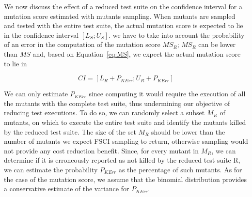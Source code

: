 We now discuss the effect of a reduced test suite on the confidence interval for a mutation score estimated with mutants sampling. When mutants are sampled and tested with the entire test suite, the actual mutation score is expected to lie in the confidence interval $[\mathit{L}_{S};\mathit{U}_{S}]$.
we have to take into account the probability of an error in the computation of the mutation score $\mathit{MS}_R$;  $\mathit{MS}_R$ can be lower than $\mathit{MS}$ and, based on Equation~\ref{eq:MS}, we expect the actual mutation score to lie in

\begin{equation}
\label{eq:CI_2}
\mathit{CI}=[\mathit{L}_{R}+P_\mathit{KErr};\mathit{U}_{R}+P_{\mathit{KErr}}]
\end{equation}

We can only estimate  $P_{\mathit{KErr}}$ since computing it would require the execution of all the mutants with the complete test suite, thus undermining our objective of reducing test executions.
To do so, we can randomly select a subset $M_R$ of mutants, on which to execute the entire test suite and identify the mutants killed by the reduced test suite. %
The size of the set $M_R$ should be lower than the number of mutants we expect FSCI sampling to return,
otherwise sampling would not provide any cost reduction benefit.
Since, for every mutant in $M_R$, we can determine if it is erroneously reported as not killed by the reduced test suite R,
we can
estimate the probability $P_{\mathit{KErr}}$ as the percentage of such mutants.
As for the case of the mutation score,
we assume that the binomial distribution provides a conservative estimate of the variance for $P_{\mathit{KErr}}$.

